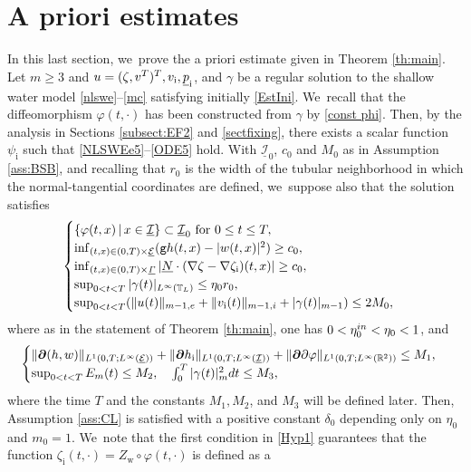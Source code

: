 \documentclass[11pt]{article}
\newcommand{\gr}{{\mathtt g}}
\newcommand{\R}{{\mathbb R}}
\newcommand{\cI}{{\mathcal I}}
\newcommand{\cE}{{\mathcal E}}
\newcommand{\ul}[1]{\underline{#1}}
\newcommand{\itGamma}{\mathit{\Gamma}}
\theoremstyle{definition}
\begin{document}
\section{A priori estimates}\label{sect:APE}
In this last section, we~prove the a priori estimate given in Theorem \ref{th:main}.
Let $m\geq 3$ and $u=(\zeta,v^{\rm T})^{\rm T}, v_\mathrm{i}, \ul{p}_\mathrm{i}$, and $\gamma$ be a regular solution
to the shallow water model \eqref{nlswe}--\eqref{mc} satisfying initially \eqref{EstIni}. We~recall that the diffeomorphism $\varphi(t,\cdot)$ has been constructed from $\gamma$ by \eqref{const phi}.
Then, by the analysis in Sections \ref{subsect:EF2} and \ref{sectfixing},
there exists a scalar function $\psi_\mathrm{i}$ such that \eqref{NLSWEe5}--\eqref{ODE5} hold.
With $ \ul{\cI}_0$, $c_0$ and $M_0$ as in Assumption \ref{ass:BSB},
and recalling that $r_0$ is the width of the tubular neighborhood in which the normal-tangential coordinates are defined, we~suppose also that the solution satisfies
\begin{equation}\label{Hyp1}
\begin{cases}
\{ \varphi(t,x) \,|\, x\in\ul{\cI} \} \subset \ul{\cI}_0 \mbox{ for } 0\leq t\leq T, \\
\inf_{(t,x)\in(0,T)\times\ul{\cE}}(\gr h(t,x)-|w(t,x)|^2) \geq c_0, \\
\inf_{(t,x)\in(0,T)\times\ul{\itGamma}}| \ul{N}\cdot(\nabla\zeta-\nabla\zeta_\mathrm{i})(t,x)| \geq c_0, \\
\sup_{0<t<T}|\gamma(t)|_{L^\infty(\mathbb{T}_L)} \leq \eta_0r_0, \\
\sup_{0<t<T}(\|u(t)\|_{m-1,{\rm e}} + \|v_\mathrm{i}(t)\|_{m-1,{\rm i}} + |\gamma(t)|_{m-1}) \leq 2M_0,
\end{cases}
\end{equation}
where as in the statement of Theorem \ref{th:main}, one has $0<\eta_0^{\rm in}<\eta_0<1$, and
\begin{equation}\label{Hyp2}
\begin{cases}
\|\bm{\partial}(h,w)\|_{L^1(0,T;L^\infty(\ul{\cE}))} + \|\bm{\partial} h_\mathrm{i}\|_{L^1(0,T;L^\infty(\ul{\cI}))}
+ \|\bm{\partial}\partial\varphi\|_{L^1(0,T;L^\infty(\R^2))} \leq M_1, \\
\sup_{0<t<T}E_m(t) \leq M_2, \quad \int_0^T|\gamma(t)|_m^2{\rm d}t \leq M_3,
\end{cases}
\end{equation}
where the time $T$ and the constants $M_1, M_2$, and $M_3$ will be defined later.
Then, Assumption \ref{ass:CL} is satisfied with a positive constant $\delta_0$ depending only on $\eta_0$ and $m_0=1$. We~note that the first condition in \eqref{Hyp1} guarantees that the function $\zeta_\mathrm{i}(t,\cdot)=Z_\mathrm{w}\circ\varphi(t,\cdot)$ is defined as a
\end{document}
